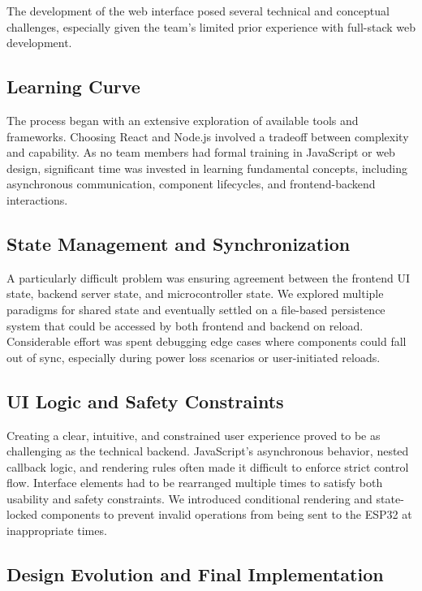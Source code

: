 \documentclass[12pt]{article}
\begin{document}
            The development of the web interface posed several technical and conceptual challenges, especially given the team’s limited prior experience with full-stack web development.
            
            \subsection{Learning Curve}
            
            The process began with an extensive exploration of available tools and frameworks. Choosing React and Node.js involved a tradeoff between complexity and capability. As no team members had formal training in JavaScript or web design, significant time was invested in learning fundamental concepts, including asynchronous communication, component lifecycles, and frontend-backend interactions.
            
            \subsection{State Management and Synchronization}
            
            A particularly difficult problem was ensuring agreement between the frontend UI state, backend server state, and microcontroller state. We explored multiple paradigms for shared state and eventually settled on a file-based persistence system that could be accessed by both frontend and backend on reload. Considerable effort was spent debugging edge cases where components could fall out of sync, especially during power loss scenarios or user-initiated reloads.
            
            \subsection{UI Logic and Safety Constraints}
            
            Creating a clear, intuitive, and constrained user experience proved to be as challenging as the technical backend. JavaScript’s asynchronous behavior, nested callback logic, and rendering rules often made it difficult to enforce strict control flow. Interface elements had to be rearranged multiple times to satisfy both usability and safety constraints. We introduced conditional rendering and state-locked components to prevent invalid operations from being sent to the ESP32 at inappropriate times.
            
            \subsection{Design Evolution and Final Implementation}
            
\end{document}
